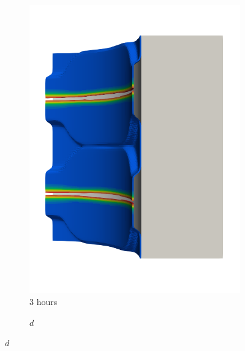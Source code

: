 \begin{figure}[!htb]
\begin{subfigure}[b]{0.2\textwidth}
    \includegraphics[width=\textwidth]{Chapter5/figures/spallation/seed_d_7}
    \caption{3 hours}
  \end{subfigure}
  \begin{subfigure}[b]{0.1\textwidth}
    \centering
    \caption*{$d$}

\end{subfigure}
\end{figure}
